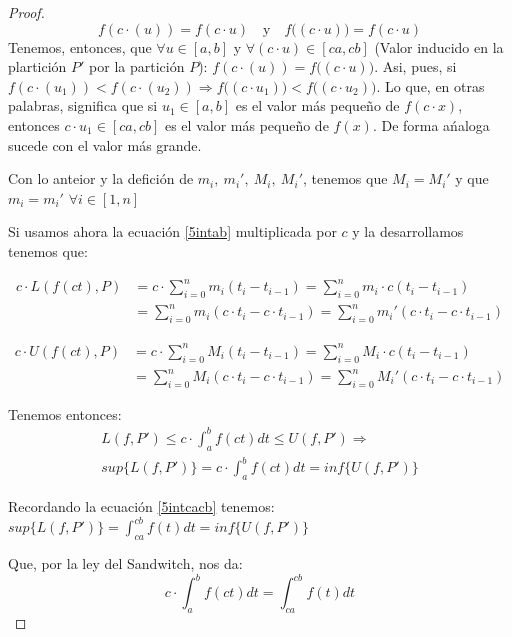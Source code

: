 \documentclass[12pt]{article}
\begin{document}
\begin{proof}
    \[f(c\cdot (u))=f(c\cdot u) \quad \text{y}  \quad f\big((c\cdot u)\big)=f(c\cdot u)\]
    Tenemos, entonces, que \(\forall u\in[a,b]\) y \(\forall (c\cdot u) \in [ca,cb]\) (Valor inducido en la plartici\'on $P'$ por la partici\'on $P$): \(f(c\cdot (u))=f\big((c\cdot u)\big)\).\bigskip
    Asi, pues, si \(f(c\cdot (u_1))<f(c\cdot (u_2)) \Longrightarrow f\big((c\cdot u_1)\big)<f\big((c\cdot u_2)\big)\). Lo que, en otras palabras, significa que si \(u_1\in[a,b]\) es el valor m\'as pequeño de $f(c\cdot x)$, entonces \(c\cdot u_1\in[ca,cb]\) es el valor m\'as pequeño de $f(x)$. De forma a\'naloga sucede con el valor m\'as grande.\bigskip

    Con lo anteior y la defici\'on de \(m_i, \ m_i', \ M_i, \ M_i'\), tenemos que \(M_i=M_i'\) y que \(m_i=m_i'\) \(\forall i\in[1,n]\)

    Si usamos ahora la ecuaci\'on \eqref{5intab} multiplicada por $c$ y la desarrollamos tenemos que:

    \begin{align*}
        c\cdot L(f(ct),P) &= c \cdot \sum_{i=0}^n m_i(t_i-t_{i-1}) = \sum_{i=0}^n m_i\cdot c(t_i-t_{i-1}) \\
        &= \sum_{i=0}^n m_i(c\cdot t_i-c\cdot t_{i-1}) = \sum_{i=0}^n m_i'(c\cdot t_i-c\cdot t_{i-1})
    \end{align*}

    \begin{align*}
        c\cdot U(f(ct),P) &= c \cdot \sum_{i=0}^n M_i(t_i-t_{i-1}) = \sum_{i=0}^n M_i\cdot c(t_i-t_{i-1}) \\
        &= \sum_{i=0}^n M_i(c\cdot t_i-c\cdot t_{i-1}) = \sum_{i=0}^n M_i'(c\cdot t_i-c\cdot t_{i-1})
    \end{align*}

    Tenemos entonces:
    \begin{multline*}
        L(f,P')\leq c\cdot\int_{a}^{b}f(ct)dt\leq U(f,P') \Longrightarrow \\ sup\{L(f,P')\}=c\cdot\int_{a}^{b}f(ct)dt=inf\{U(f,P')\}
    \end{multline*}

    Recordando la ecuaci\'on \eqref{5intcacb} tenemos: \(sup\{L(f,P')\}=\displaystyle\int_{ca}^{cb}f(t)dt=inf\{U(f,P')\}\)

    Que, por la ley del Sandwitch, nos da:
    \begin{equation*}
        c\cdot\int_{a}^{b}f(ct)dt=\int_{ca}^{cb}f(t)dt
    \end{equation*}


\end{proof}
\end{document}
